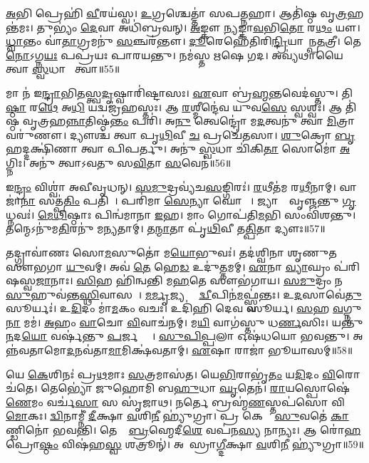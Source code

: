 \ul{𑌅}𑌭𑌿 𑌪𑍍𑌰𑍇𑌹𑌿॑ \ul{𑌵𑍀}𑌰𑌯॑𑌸𑍍𑌵।
\ul{𑌉}𑌗𑍍𑌰𑌶𑍍𑌚𑍇𑌤𑍍𑌤𑌾॑ 𑌸𑌪\ul{𑌤𑍍𑌨}𑌹𑌾।
𑌆𑌤𑌿॑𑌷𑍍𑌠 𑌵𑍃\ul{𑌤𑍍𑌰}𑌹𑌨𑍍𑌤॑𑌮𑌃।
𑌤𑍁𑌭𑍍𑌯𑌂॑ \ul{𑌦𑍇}𑌵𑌾 𑌅𑌧𑌿॑𑌬𑍍𑌰𑌵𑌨𑍍।
\ul{𑌅}𑌙𑍍𑌕𑍗 \ul{𑌨𑍍𑌯}𑌙𑍍𑌕𑌾\ul{𑌵}𑌭𑌿\ul{𑌤𑍋} 𑌰\ul{𑌥𑌂} 𑌯𑍗।
\ul{𑌧𑍍𑌵𑌾}𑌨𑍍𑌤𑌂 𑌵𑌾॑\ul{𑌤𑌾}𑌗𑍍𑌰𑌮𑌨𑍁॑ \ul{𑌸}𑌞𑍍𑌚𑌰॑𑌨𑍍𑌤𑍗।
\ul{𑌦𑍂}𑌰𑍇𑌹𑍇॑𑌤𑌿𑌰𑌿\ul{𑌨𑍍𑌦𑍍𑌰𑌿}𑌯𑌾𑌵𑌾᳚𑌨𑍍𑌪\ul{𑌤}𑌤𑍍𑌰𑍀।
𑌤𑍇 \ul{𑌨𑍋}\-𑌽𑌗𑍍𑌨\ul{𑌯𑌃} 𑌪𑌪𑍍𑌰॑𑌯𑌃 𑌪𑌾𑌰𑌯𑌨𑍍𑌤𑍁।
𑌨𑌮॑𑌸𑍍𑌤 𑌋𑌷𑍇 𑌗𑌦।
𑌅𑌵𑍍𑌯॑𑌥𑌾𑌯𑍈 𑌤𑍍𑌵𑌾 \ul{𑌸𑍍𑌵}𑌧𑌾𑌯𑍈᳚ 𑌤𑍍𑌵𑌾॥55॥

𑌮𑌾 𑌨॑ 𑌇\ul{𑌨𑍍𑌦𑍍𑌰𑌾}𑌭𑌿\ul{𑌤}𑌸𑍍𑌤𑍍𑌵\ul{𑌦𑍃}𑌷𑍍𑌵𑌾𑌰𑌿॑𑌷𑍍𑌟𑌾𑌸𑌃।
\ul{𑌏}𑌵𑌾 𑌬𑍍𑌰॑\ul{𑌹𑍍𑌮}𑌨𑍍𑌤𑌵𑍇𑌦॑𑌸𑍍𑌤𑍁।
𑌤𑌿\ul{𑌷𑍍𑌠𑌾} 𑌰\ul{𑌥𑍇} 𑌅\ul{𑌧𑌿} 𑌯𑌦𑍍𑌵𑌜𑍍𑌰॑𑌹𑌸𑍍𑌤𑌃।
𑌆 \ul{𑌰}𑌶𑍍𑌮𑍀𑌨𑍍𑌦𑍇॑𑌵 𑌯𑍁𑌵\ul{𑌸𑍇} 𑌸𑍍𑌵𑌶𑍍𑌵𑌃॑।
𑌆 𑌤𑌿॑𑌷𑍍𑌠 𑌵𑍃𑌤𑍍𑌰𑌹\ul{𑌨𑍍𑌨𑌾}𑌤𑌿𑌷𑍍𑌠॑\ul{𑌨𑍍𑌤𑌂} 𑌪𑌰𑌿॑।
𑌅\ul{𑌨𑍁} 𑌤𑍍𑌵𑍇𑌨𑍍𑌦𑍍𑌰𑍋॑ 𑌮\ul{𑌦}𑌤𑍍𑌵𑌨𑍁॑ 𑌤𑍍𑌵𑌾 \ul{𑌮𑌿}𑌤𑍍𑌰𑌾𑌵𑌰𑍁॑𑌣𑍗।
𑌦𑍍𑌯𑍗𑌶𑍍𑌚॑ 𑌤𑍍𑌵𑌾 𑌪𑍃\ul{𑌥𑌿}𑌵𑍀 \ul{𑌚} 𑌪𑍍𑌰𑌚𑍇॑𑌤𑌸𑌾।
\ul{𑌶𑍁}𑌕𑍍𑌰𑍋 \ul{𑌬𑍃}𑌹𑌦𑍍𑌦𑌕𑍍𑌷𑌿॑𑌣𑌾 𑌤𑍍𑌵𑌾 𑌪𑌿𑌪𑌰𑍍𑌤𑍁।
𑌅𑌨𑍁॑ \ul{𑌸𑍍𑌵}𑌧𑌾 𑌚𑌿॑𑌕𑌿\ul{𑌤𑌾}\ul{} 𑌸𑍋𑌮𑍋॑ \ul{𑌅}𑌗𑍍𑌨𑌿𑌃।
𑌅𑌨𑍁॑ 𑌤𑍍𑌵𑌾𑌽𑌵𑌤𑍁 𑌸\ul{𑌵𑌿}𑌤𑌾 \ul{𑌸}𑌵𑍇𑌨॑॥56॥

𑌇\ul{𑌨𑍍𑌦𑍍𑌰𑌂} 𑌵𑌿𑌶𑍍𑌵𑌾॑ 𑌅𑌵𑍀𑌵𑍃𑌧𑌨𑍍।
\ul{𑌸}\ul{𑌮𑍁}𑌦𑍍𑌰𑌵𑍍𑌯॑𑌚\ul{𑌸}𑌙𑍍𑌗𑌿𑌰𑌃॑।
\ul{𑌰}𑌥𑍀𑌤॑𑌮 𑌰\ul{𑌥𑍀}𑌨𑌾𑌮𑍍।
𑌵𑌾𑌜𑌾॑\ul{𑌨𑌾}\ul{} 𑌸𑌤𑍍𑌪॑\ul{𑌤𑌿𑌂} 𑌪𑌤𑌿𑌮𑍍᳚।
𑌪𑌰𑌿॑𑌮𑌾 \ul{𑌸𑍇}𑌨𑍍𑌯𑌾 𑌘𑍋𑌷𑌾𑌃᳚।
𑌜𑍍𑌯𑌾𑌨𑌾𑌂᳚ 𑌵𑍃𑌞𑍍𑌜𑌨𑍍𑌤𑍁 \ul{𑌗𑍃}𑌧𑍍𑌨𑌵𑌃॑।
\ul{𑌮𑍇}\ul{𑌥𑌿}𑌷𑍍𑌠𑌾𑌃 𑌪𑌿𑌨𑍍𑌵॑𑌮𑌾𑌨𑌾 \ul{𑌇}𑌹।
𑌮𑌾𑌂 𑌗𑍋𑌪॑𑌤𑌿\ul{𑌮}𑌭𑌿 𑌸𑌂𑌵𑌿॑𑌶𑌨𑍍𑌤𑍁।
𑌤𑌨𑍍𑌮𑍇\-𑌽𑌨𑍁॑𑌮\ul{𑌤𑌿}𑌰𑌨𑍁॑ 𑌮𑌨𑍍𑌯𑌤𑌾𑌮𑍍।
𑌤\ul{𑌨𑍍𑌮𑌾}𑌤𑌾 𑌪𑍃॑\ul{𑌥𑌿}𑌵𑍀 𑌤\ul{𑌤𑍍𑌪𑌿}𑌤𑌾 𑌦𑍍𑌯𑍗𑌃॥57॥

𑌤𑌦𑍍𑌗𑍍𑌰𑌾𑌵𑌾॑𑌣𑌃 𑌸𑍋\ul{𑌮}𑌸𑍁𑌤𑍋॑ 𑌮\ul{𑌯𑍋}𑌭𑍁𑌵𑌃॑।
𑌤𑌦॑𑌶𑍍𑌵𑌿𑌨𑌾 𑌶𑍃𑌣𑍁𑌤 𑌸𑍗𑌭𑌗𑌾 \ul{𑌯𑍁}𑌵𑌮𑍍।
𑌅𑌵॑ \ul{𑌤𑍇} 𑌹𑍇\ul{𑌡} 𑌉𑌦𑍁॑\ul{𑌤𑍍𑌤}𑌮𑌮𑍍।
\ul{𑌏}𑌨𑌾 \ul{𑌵𑍍𑌯𑌾}𑌘𑍍𑌰𑌂 𑌪॑𑌰𑌿𑌷𑌸𑍍𑌵\ul{𑌜𑌾}𑌨𑌾𑌃।
\ul{𑌸𑌿}\ul{}𑌹 𑌹𑌿॑𑌨𑍍𑌵𑌨𑍍𑌤𑌿 𑌮\ul{𑌹}𑌤𑍇 𑌸𑍗𑌭॑𑌗𑌾𑌯।
\ul{𑌸}\ul{𑌮𑍁}𑌦𑍍𑌰𑌂 𑌨 \ul{𑌸𑍁}𑌹𑍁𑌵॑𑌨𑍍𑌤\ul{𑌸𑍍𑌥𑌿}𑌵𑌾𑌸𑌮𑍍᳚।
\ul{𑌮}\ul{𑌰𑍍𑌮𑍃}𑌜𑍍𑌯𑌨𑍍𑌤𑍇᳚ \ul{𑌦𑍍𑌵𑍀}𑌪𑌿𑌨॑\ul{𑌮}𑌫𑍍𑌸𑍍𑌵॑𑌨𑍍𑌤𑌃।
𑌉\ul{𑌦}𑌸𑌾𑌵𑍇॑\ul{𑌤𑍁} 𑌸𑍂𑌰𑍍𑌯𑌃॑।
𑌉\ul{𑌦𑌿}𑌦𑌂 𑌮𑌾॑\ul{𑌮}𑌕𑌂 𑌵𑌚𑌃॑।
𑌉𑌦𑌿॑𑌹𑌿 𑌦𑍇𑌵 𑌸𑍂𑌰𑍍𑌯।
\ul{𑌸}𑌹 \ul{𑌵}𑌗𑍍𑌨𑍁\ul{𑌨𑌾} 𑌮𑌮॑।
\ul{𑌅}𑌹𑌂 \ul{𑌵𑌾}𑌚𑍋 \ul{𑌵𑌿}𑌵𑌾𑌚॑𑌨𑌮𑍍।
𑌮\ul{𑌯𑌿} 𑌵𑌾𑌗॑𑌸𑍍𑌤𑍁 𑌧\ul{𑌰𑍍𑌣}𑌸𑌿𑌃।
𑌯𑌨𑍍𑌤𑍁॑ \ul{𑌨}𑌦\ul{𑌯𑍋} 𑌵𑌰𑍍\mbox{}𑌷॑𑌨𑍍𑌤𑍁 \ul{𑌪}𑌰𑍍𑌜𑌨𑍍𑌯𑌾𑌃᳚।
\ul{𑌸𑍁}\ul{𑌪𑌿}\ul{𑌪𑍍𑌪}𑌲𑌾 𑌓𑌷॑𑌧𑌯𑍋 𑌭𑌵𑌨𑍍𑌤𑍁।
𑌅𑌨𑍍𑌨॑𑌵𑌤𑌾𑌮𑍋\ul{𑌦}𑌨𑌵॑𑌤𑌾\ul{𑌮𑌾}𑌮𑌿𑌕𑍍𑌷॑𑌵𑌤𑌾𑌮𑍍।
\ul{𑌏}𑌷𑌾 𑌰𑌾𑌜𑌾॑ 𑌭𑍂𑌯𑌾𑌸𑌮𑍍॥58॥\anuvakamend[\ul{𑌸𑍍𑌵}𑌧𑌾𑌯𑍈᳚ 𑌤𑍍𑌵𑌾 \ul{𑌸}𑌵𑍇\ul{𑌨} 𑌦𑍍𑌯𑍗𑌃 𑌸𑍂᳚𑌰𑍍𑌯 \ul{𑌸}𑌪𑍍𑌤 𑌚॑]

𑌯𑍇 \ul{𑌕𑍇}𑌶𑌿𑌨𑌃॑ 𑌪𑍍𑌰\ul{𑌥}𑌮𑌾𑌃 \ul{𑌸}𑌤𑍍𑌰𑌮𑌾𑌸॑𑌤।
𑌯𑍇\ul{𑌭𑌿}𑌰𑌾𑌭𑍃॑\ul{𑌤𑌂} 𑌯\ul{𑌦𑌿}𑌦𑌂 \ul{𑌵𑌿}𑌰𑍋𑌚॑𑌤𑍇।
𑌤𑍇𑌭𑍍𑌯𑍋॑ 𑌜𑍁𑌹𑍋𑌮𑌿 𑌬\ul{𑌹𑍁}𑌧𑌾 \ul{𑌘𑍃}𑌤𑍇𑌨॑।
\ul{𑌰𑌾}𑌯𑌸𑍍𑌪𑍋𑌷𑍇॑\ul{𑌣𑍇}𑌮𑌂 𑌵𑌰𑍍𑌚॑\ul{𑌸𑌾} 𑌸 𑌸𑍃॑𑌜𑌾𑌥।
𑌨𑌰𑍍𑌤𑍇 𑌬𑍍𑌰𑌹𑍍𑌮॑\ul{𑌣}𑌸𑍍𑌤𑌪॑𑌸𑍋 𑌵𑌿\ul{𑌮𑍋}𑌕𑌃।
\ul{𑌦𑍍𑌵𑌿}𑌨𑌾𑌮𑍍𑌨𑍀॑ \ul{𑌦𑍀}𑌕𑍍𑌷𑌾 \ul{𑌵}𑌶𑌿\ul{𑌨𑍀} 𑌹𑍍𑌯𑍁॑𑌗𑍍𑌰𑌾।
𑌪𑍍𑌰 𑌕𑍇𑌶𑌾𑌃᳚ \ul{𑌸𑍁}𑌵𑌤𑍇॑ \ul{𑌕𑌾}𑌣𑍍𑌡𑌿𑌨𑍋॑ 𑌭𑌵𑌨𑍍𑌤𑌿।
𑌤𑍇𑌷𑌾𑌂᳚ \ul{𑌬𑍍𑌰}𑌹𑍍𑌮𑍇𑌦𑍀\ul{𑌶𑍇} 𑌵𑌪॑𑌨\ul{𑌸𑍍𑌯} 𑌨𑌾𑌨𑍍𑌯𑌃।
𑌆 𑌰𑍋॑\ul{𑌹} 𑌪𑍍𑌰𑍋\ul{𑌷𑍍𑌠𑌂} 𑌵𑌿𑌷॑𑌹\ul{𑌸𑍍𑌵} 𑌶𑌤𑍍𑌰𑍂𑌨𑍍॑।
𑌅𑌵𑌾᳚𑌸𑍍𑌰𑌾\ul{𑌗𑍍𑌦𑍀}𑌕𑍍𑌷𑌾 \ul{𑌵}𑌶𑌿\ul{𑌨𑍀} 𑌹𑍍𑌯𑍁॑𑌗𑍍𑌰𑌾॥59॥

